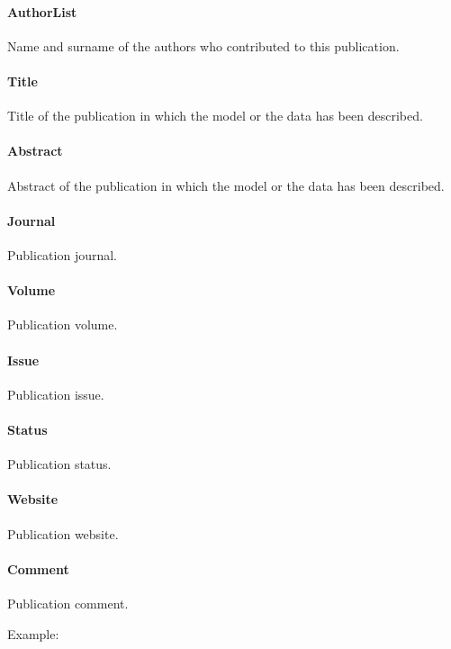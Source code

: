 \documentclass[a4paper]{report}
\begin{document}
\paragraph{AuthorList}
Name and surname of the authors who contributed to this publication.

\paragraph{Title}
Title of the publication in which the model or the data has been described.

\paragraph{Abstract}
Abstract of the publication in which the model or the data has been described.

\paragraph{Journal}
Publication journal.

\paragraph{Volume}
Publication volume.

\paragraph{Issue}
Publication issue.

\paragraph{Status}
Publication status.

\paragraph{Website}
Publication website.

\paragraph{Comment}
Publication comment.

Example:
\end{document}
